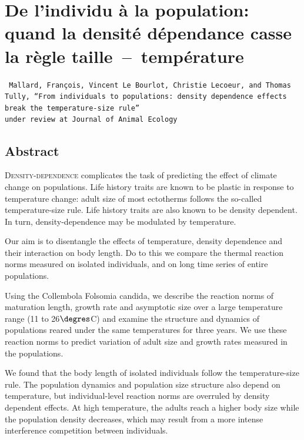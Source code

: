 \chapter[De l'individu à la population: quand la densité dépendense casse la
règle taille~--~température][Densité dépendance et température]{De l'individu à la population: quand la densité dépendance casse la
règle taille~--~température}
\label{Ann:fip}

\vspace{2cm}

\texttt{
Mallard, François, Vincent Le Bourlot, Christie Lecoeur, and Thomas Tully, ``From
individuals to populations:
density dependence effects break the temperature-size rule''\\
under review at Journal of Animal Ecology
}

\section*{Abstract}

\lettrine[lines=3]{D}{ensity-dependence} complicates the task of predicting the
effect of climate change on populations. Life history traits are known to be
plastic in response to temperature change: adult size of most ectotherms follows
the so-called temperature-size rule. Life history traits are also known to be
density dependent. In turn, density-dependence may be modulated by temperature.

Our aim is to disentangle the effects of temperature, density dependence and
their interaction on body length. Do to this we compare the thermal reaction
norms measured on isolated individuals, and on long time series of entire
populations.

Using the Collembola Folsomia candida, we describe the reaction norms of
maturation length, growth rate and asymptotic size over a large temperature
range (11 to 26$\degres$C) and examine the structure and dynamics of populations
reared under the same temperatures for three years. We use these reaction norms to
predict variation of adult size and growth rates measured in the populations.

We found that the body length of isolated individuals follow the
temperature-size rule. The population dynamics and population size structure
also depend on temperature, but individual-level reaction norms are overruled by
density dependent effects. At high temperature, the adults reach a higher body
size while the population density decreases, which may result from a more
intense interference competition between individuals.

